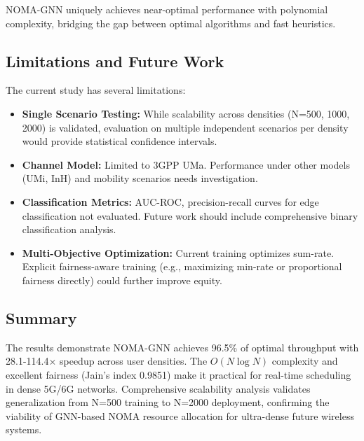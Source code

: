 NOMA-GNN uniquely achieves near-optimal performance with polynomial complexity, bridging the gap between optimal algorithms and fast heuristics.

\subsection{Limitations and Future Work}

The current study has several limitations:

\begin{itemize}
    \item \textbf{Single Scenario Testing:} While scalability across densities (N=500, 1000, 2000) is validated, evaluation on multiple independent scenarios per density would provide statistical confidence intervals.
    
    \item \textbf{Channel Model:} Limited to 3GPP UMa. Performance under other models (UMi, InH) and mobility scenarios needs investigation.
    
    \item \textbf{Classification Metrics:} AUC-ROC, precision-recall curves for edge classification not evaluated. Future work should include comprehensive binary classification analysis.
    
    \item \textbf{Multi-Objective Optimization:} Current training optimizes sum-rate. Explicit fairness-aware training (e.g., maximizing min-rate or proportional fairness directly) could further improve equity.
\end{itemize}

\subsection{Summary}

The results demonstrate NOMA-GNN achieves 96.5\% of optimal throughput with 28.1-114.4× speedup across user densities. The $O(N \log N)$ complexity and excellent fairness (Jain's index 0.9851) make it practical for real-time scheduling in dense 5G/6G networks. Comprehensive scalability analysis validates generalization from N=500 training to N=2000 deployment, confirming the viability of GNN-based NOMA resource allocation for ultra-dense future wireless systems.


